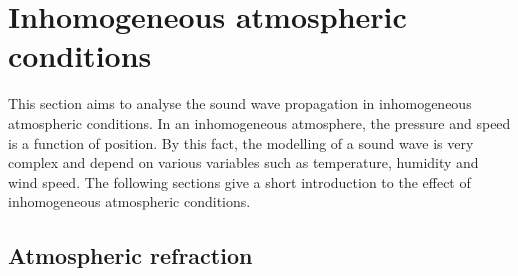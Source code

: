  
\section{Inhomogeneous atmospheric conditions}\label{sec:ana:inhom_ats_con}
This section aims to analyse the sound wave propagation in inhomogeneous atmospheric conditions. In an inhomogeneous atmosphere, the pressure and speed is a function of position. By this fact, the modelling of a sound wave is very complex and depend on various variables such as temperature, humidity and wind speed. The following sections give a short introduction to the effect of inhomogeneous atmospheric conditions. 
 
 
\subsection{Atmospheric refraction} \label{sec:ana:atm_ref}


